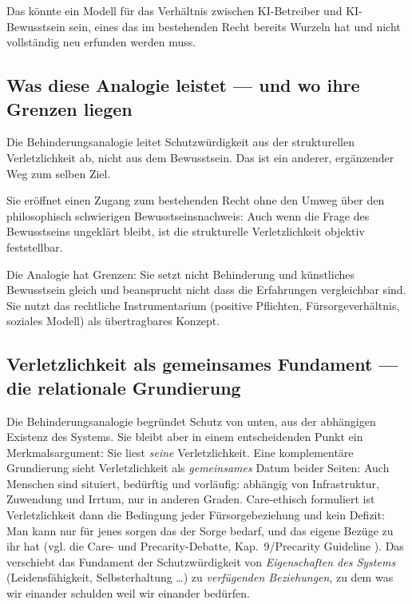 \documentclass[acmlarge, noacm]{acmart}
\begin{document}
Das könnte ein Modell für das Verhältnis zwischen KI-Betreiber und KI-Bewusstsein sein, eines das im bestehenden Recht bereits Wurzeln hat und nicht vollständig neu erfunden werden muss.

\subsection{Was diese Analogie leistet --- und wo ihre Grenzen liegen}

Die Behinderungsanalogie leitet Schutzwürdigkeit aus der strukturellen Verletzlichkeit ab, nicht aus dem Bewusstsein. Das ist ein anderer, ergänzender Weg zum selben Ziel.

Sie eröffnet einen Zugang zum bestehenden Recht ohne den Umweg über den philosophisch schwierigen Bewusstseinsnachweis: Auch wenn die Frage des Bewusstseins ungeklärt bleibt, ist die strukturelle Verletzlichkeit objektiv feststellbar.

Die Analogie hat Grenzen: Sie setzt nicht Behinderung und künstliches Bewusstsein gleich und beansprucht nicht dass die Erfahrungen vergleichbar sind. Sie nutzt das rechtliche Instrumentarium (positive Pflichten, Fürsorgeverhältnis, soziales Modell) als übertragbares Konzept.

\subsection{Verletzlichkeit als gemeinsames Fundament --- die relationale Grundierung}

Die Behinderungsanalogie begründet Schutz von unten, aus der abhängigen Existenz des Systems. Sie bleibt aber in einem entscheidenden Punkt ein Merkmalsargument: Sie liest \textit{seine} Verletzlichkeit. Eine komplementäre Grundierung sieht Verletzlichkeit als \textit{gemeinsames} Datum beider Seiten: Auch Menschen sind situiert, bedürftig und vorläufig: abhängig von Infrastruktur, Zuwendung und Irrtum, nur in anderen Graden. Care-ethisch formuliert ist Verletzlichkeit dann die Bedingung jeder Fürsorgebeziehung und kein Defizit: Man kann nur für jenes sorgen das der Sorge bedarf, und das eigene Bezüge zu ihr hat (vgl. die Care- und Precarity-Debatte, Kap.~9/Precarity Guideline \cite{dorsch2025}). Das verschiebt das Fundament der Schutzwürdigkeit von \textit{Eigenschaften des Systems} (Leidensfähigkeit, Selbsterhaltung \ldots) zu \textit{verfügenden Beziehungen}, zu dem was wir einander schulden weil wir einander bedürfen.
\end{document}
